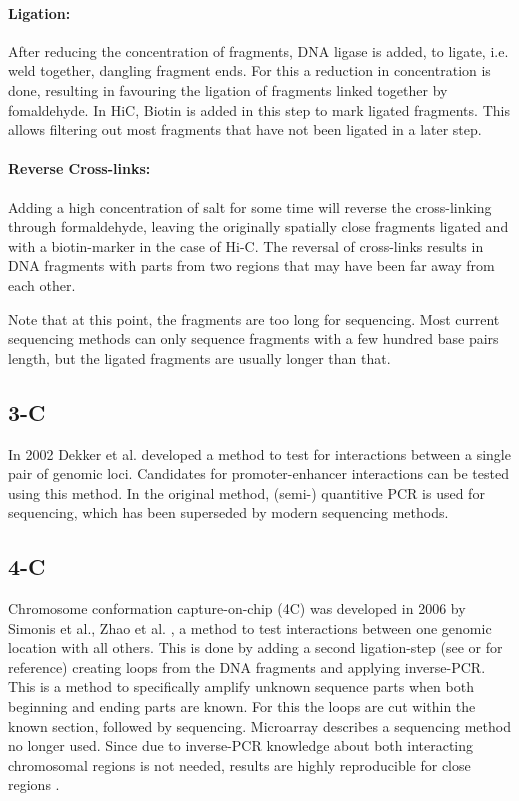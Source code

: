 \paragraph{Ligation:}\label{sec:ligation}
After reducing the concentration of fragments, DNA ligase is added, to ligate,
i.e. weld together, dangling fragment ends. For this a reduction in
concentration is done, resulting in favouring the ligation of fragments linked
together by fomaldehyde.
In HiC, Biotin is added in this step to mark ligated fragments. This allows
filtering out most fragments that have not been ligated in a later step.


\paragraph{Reverse Cross-links:}\label{sec:revcrosslink}
Adding a high concentration of salt for some time will reverse the
cross-linking through formaldehyde, leaving the originally spatially close
fragments ligated and with a biotin-marker in the case of Hi-C.
The reversal of cross-links results in DNA fragments with parts from two
regions that may have been far away from each other.

Note that at this point, the fragments are too long for sequencing. Most
current sequencing methods can only sequence fragments with a few hundred base
pairs length, but the ligated fragments are usually longer than that.



\subsection{3-C}\label{sec:3C}

In 2002 Dekker et al. \cite{dekker2002capturing} developed a method to test for
interactions between a single pair of genomic loci. Candidates for
promoter-enhancer interactions can be tested using this method.
In the original method, (semi-) quantitive PCR is used for sequencing, which
has been superseded by modern sequencing methods.


\subsection{4-C}\label{sec:4C}

Chromosome conformation capture-on-chip (4C) was developed in 2006 by Simonis
et al., Zhao et al. \cite{simonis2006nuclear} \cite{zhao2006circular}, a method
to test interactions between one genomic location with all others. This is done
by adding a second ligation-step (see  or 
for reference) creating loops from the DNA fragments and applying inverse-PCR.
This is a method to specifically amplify unknown sequence parts when both
beginning and ending parts are known. For this the loops are cut within the
known section, followed by sequencing. Microarray describes a sequencing
method no longer used. Since due to inverse-PCR knowledge about both
interacting chromosomal regions is not needed, results are highly reproducible
for close regions .



